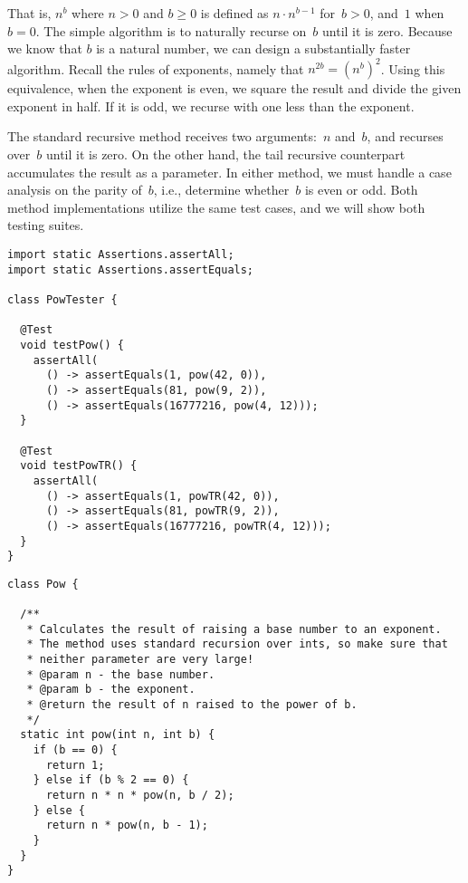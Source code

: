 That is, $n^b$ where $n > 0$ and $b \geq 0$ is defined as $n \cdot n^{b-1}$ for~$b > 0$, and~$1$ when~$b=0$.
The simple algorithm is to naturally recurse on~$b$ until it is zero. 
Because we know that $b$ is a natural number, we can design a substantially faster algorithm.
Recall the rules of exponents, namely that $n^{2b} = (n^b)^2$. 
Using this equivalence, when the exponent is even, we square the result and divide the given exponent in half.
If it is odd, we recurse with one less than the exponent.

The standard recursive  method receives two arguments:~$n$ and~$b$, and recurses over~$b$ until it is zero.
On the other hand, the tail recursive counterpart accumulates the result as a parameter.
In either method, we must handle a case analysis on the parity of~$b$, i.e., determine whether~$b$ is even or odd.
Both method implementations utilize the same test cases, and we will show both testing suites.

\begin{lstlisting}[language=MyJava]
import static Assertions.assertAll;
import static Assertions.assertEquals;

class PowTester {

  @Test
  void testPow() {
    assertAll(
      () -> assertEquals(1, pow(42, 0)),
      () -> assertEquals(81, pow(9, 2)),
      () -> assertEquals(16777216, pow(4, 12)));
  }

  @Test
  void testPowTR() {
    assertAll(
      () -> assertEquals(1, powTR(42, 0)),
      () -> assertEquals(81, powTR(9, 2)),
      () -> assertEquals(16777216, powTR(4, 12)));
  }
}
\end{lstlisting}

\begin{lstlisting}[language=MyJava]
class Pow {

  /**
   * Calculates the result of raising a base number to an exponent.
   * The method uses standard recursion over ints, so make sure that
   * neither parameter are very large!
   * @param n - the base number.
   * @param b - the exponent.
   * @return the result of n raised to the power of b.
   */
  static int pow(int n, int b) {
    if (b == 0) {
      return 1;
    } else if (b % 2 == 0) {
      return n * n * pow(n, b / 2);
    } else {
      return n * pow(n, b - 1);
    }
  }
}
\end{lstlisting}

